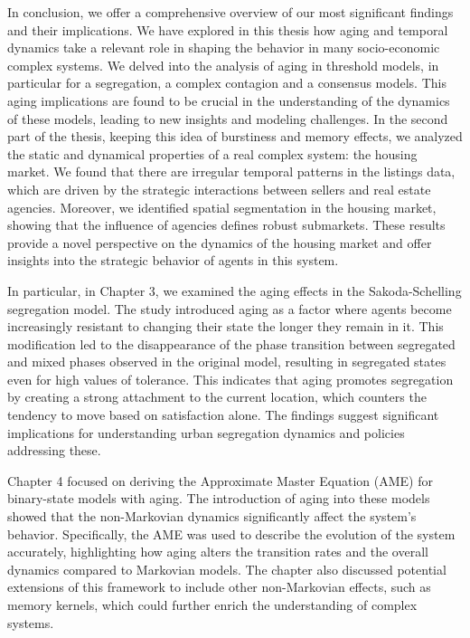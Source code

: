 In conclusion, we offer a comprehensive overview of our most
significant findings and their implications. We have explored in this thesis how aging and temporal dynamics take a relevant role in shaping the behavior in many socio-economic complex systems. We delved into the analysis of aging in threshold models, in particular for a segregation, a complex contagion and a consensus models. This aging implications are found to be crucial in the understanding of the dynamics of these models, leading to new insights and modeling challenges. In the second part of the thesis, keeping this idea of burstiness and memory effects, we analyzed the static and dynamical properties of a real complex system: the housing market. We found that there are irregular temporal patterns in the listings data, which are driven by the strategic interactions between sellers and real estate agencies. Moreover, we identified spatial segmentation in the housing market, showing that the influence of agencies defines robust submarkets. These results provide a novel perspective on the dynamics of the housing market and offer insights into the strategic behavior of agents in this system.

In particular, in Chapter 3, we examined the aging effects in the Sakoda-Schelling segregation model. The study introduced aging as a factor where agents become increasingly resistant to changing their state the longer they remain in it. This modification led to the disappearance of the phase transition between segregated and mixed phases observed in the original model, resulting in segregated states even for high values of tolerance. This indicates that aging promotes segregation by creating a strong attachment to the current location, which counters the tendency to move based on satisfaction alone. The findings suggest significant implications for understanding urban segregation dynamics and policies addressing these.

Chapter 4 focused on deriving the Approximate Master Equation (AME) for binary-state models with aging. The introduction of aging into these models showed that the non-Markovian dynamics significantly affect the system's behavior. Specifically, the AME was used to describe the evolution of the system accurately, highlighting how aging alters the transition rates and the overall dynamics compared to Markovian models. The chapter also discussed potential extensions of this framework to include other non-Markovian effects, such as memory kernels, which could further enrich the understanding of complex systems.

